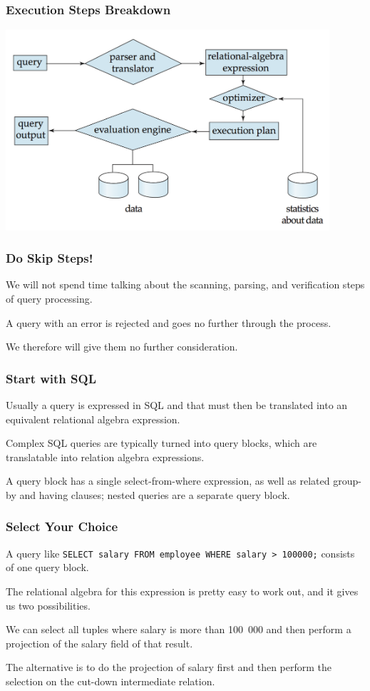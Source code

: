 \begin{frame}
\frametitle{Execution Steps Breakdown}
\begin{center}
	\includegraphics[width=0.9\textwidth]{images/query-processing-overview}
\end{center}

\end{frame}


\begin{frame}
\frametitle{Do Skip Steps!}

We will not spend time talking about the scanning, parsing, and verification steps of query processing.

A query with an error is rejected and  goes no further through the process. 

We therefore will give them no further consideration.

\end{frame}

\begin{frame}
\frametitle{Start with SQL}
Usually a query is expressed in SQL and that must then be translated into an equivalent relational algebra expression. 

Complex SQL queries are typically turned into \alert{query blocks}, which are translatable into relation algebra expressions. 

A query block has a single select-from-where expression, as well as related group-by and having clauses; nested queries are a separate query block.

\end{frame}

\begin{frame}
\frametitle{Select Your Choice}
A query like \texttt{SELECT salary FROM employee WHERE salary > 100000;} consists of one query block. 

The relational algebra for this expression is pretty easy to work out, and it gives us two possibilities. 

We can select all tuples where salary is more than 100~000 and then perform a projection of the salary field of that result. 

The alternative is to do the projection of salary first and then perform the selection on the cut-down intermediate relation.

\end{frame}


